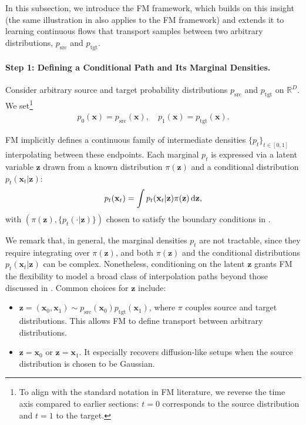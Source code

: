 In this subsection, we introduce the FM framework, which builds on this insight 
(the same illustration in  also applies to the FM framework) 
and extends it to learning continuous flows that transport samples between two arbitrary 
distributions, $p_{\text{src}}$ and $p_{\text{tgt}}$.





\paragraph{Step 1: Defining a Conditional Path and Its Marginal Densities.}
Consider arbitrary source and target probability distributions $ p_{\mathrm{src}} $ and $ p_{\mathrm{tgt}} $ on $\mathbb{R}^D$. We set\footnote{To align with the standard notation in FM literature, we reverse the time axis compared to earlier sections: $t=0$ corresponds to the source distribution and $t=1$ to the target.}
\begin{align}\label{eq:marginal-endpoint}
    p_0(\mathbf{x}) = p_{\mathrm{src}}(\mathbf{x}), \quad p_1(\mathbf{x}) = p_{\mathrm{tgt}}(\mathbf{x}).
\end{align}

FM implicitly defines a continuous family of intermediate densities $\{ p_t \}_{t \in [0,1]}$ interpolating between these endpoints. Each marginal $ p_t $ is expressed via a latent variable $\mathbf{z}$ drawn from a known distribution $\pi(\mathbf{z})$ and a conditional distribution $p_t(\mathbf{x}_t | \mathbf{z})$:
\begin{equation}\label{eq:p_t}
    p_t(\mathbf{x}_t) = \int p_t(\mathbf{x}_t | \mathbf{z}) \pi(\mathbf{z}) \mathop{}\!\mathrm{d} \mathbf{z},
\end{equation}
with $(\pi(\mathbf{z}), \{p_t(\cdot|\mathbf{z})\})$ chosen to satisfy the boundary conditions in .

We remark that, in general, the marginal densities $p_t$ are not tractable, since they require integrating over $\pi(\mathbf{z})$, and both $\pi(\mathbf{z})$ and the conditional distributions $p_t(\mathbf{x}_t|\mathbf{z})$ can be complex.
Nonetheless, conditioning on the latent $\mathbf{z}$ grants FM the flexibility to model a broad class of interpolation paths beyond those discussed in . Common choices for $\mathbf{z}$ include:
\begin{itemize}
    \item {} $\mathbf{z} = (\mathbf{x}_0, \mathbf{x}_1) \sim p_{\text{src}}(\mathbf{x}_0) p_{\text{tgt}}(\mathbf{x}_1)$, where $\pi$ couples source and target distributions. This allows FM to define transport between arbitrary distributions.
    \item {} $\mathbf{z} = \mathbf{x}_0$ or $\mathbf{z} = \mathbf{x}_1$. It especially recovers diffusion-like setups when the source distribution is chosen to be Gaussian.  
\end{itemize}

